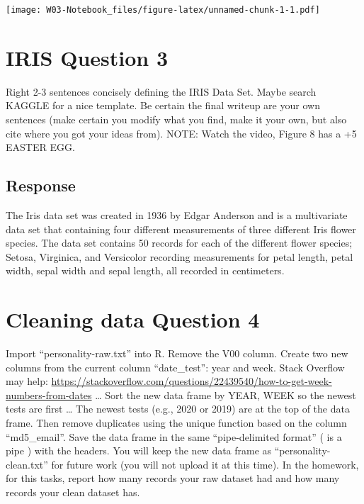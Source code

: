 \documentclass[
]{article}
\begin{document}
\texttt{[image: W03-Notebook\_files/figure-latex/unnamed-chunk-1-1.pdf]}

\hypertarget{iris-question-3}{%
\section{IRIS Question 3}\label{iris-question-3}}

Right 2-3 sentences concisely defining the IRIS Data Set. Maybe search
KAGGLE for a nice template. Be certain the final writeup are your own
sentences (make certain you modify what you find, make it your own, but
also cite where you got your ideas from). NOTE: Watch the video, Figure
8 has a +5 EASTER EGG.

\hypertarget{response}{%
\subsection{Response}\label{response}}

The Iris data set was created in 1936 by Edgar Anderson and is a
multivariate data set that containing four different measurements of
three different Iris flower species. The data set contains 50 records
for each of the different flower species; Setosa, Virginica, and
Versicolor recording measurements for petal length, petal width, sepal
width and sepal length, all recorded in centimeters.

\hypertarget{cleaning-data-question-4}{%
\section{Cleaning data Question 4}\label{cleaning-data-question-4}}

Import ``personality-raw.txt'' into R. Remove the V00 column. Create two
new columns from the current column ``date\_test'': year and week. Stack
Overflow may help:
\url{https://stackoverflow.com/questions/22439540/how-to-get-week-numbers-from-dates}
\ldots{} Sort the new data frame by YEAR, WEEK so the newest tests are
first \ldots{} The newest tests (e.g., 2020 or 2019) are at the top of
the data frame. Then remove duplicates using the unique function based
on the column ``md5\_email''. Save the data frame in the same
``pipe-delimited format'' ( \textbar{} is a pipe ) with the headers. You
will keep the new data frame as ``personality-clean.txt'' for future
work (you will not upload it at this time). In the homework, for this
tasks, report how many records your raw dataset had and how many records
your clean dataset has.
\end{document}
